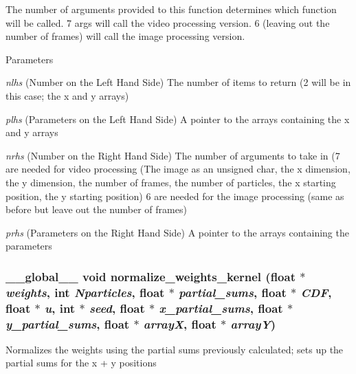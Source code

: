 The number of arguments provided to this function determines which function will be called. 7 args will call the video processing version. 6 (leaving out the number of frames) will call the image processing version. 
\begin{DoxyParams}{Parameters}
\item[{\em nlhs}](Number on the Left Hand Side) The number of items to return (2 will be in this case; the x and y arrays) \item[{\em plhs}](Parameters on the Left Hand Side) A pointer to the arrays containing the x and y arrays \item[{\em nrhs}](Number on the Right Hand Side) The number of arguments to take in (7 are needed for video processing (The image as an unsigned char, the x dimension, the y dimension, the number of frames, the number of particles, the x starting position, the y starting position) 6 are needed for the image processing (same as before but leave out the number of frames) \item[{\em prhs}](Parameters on the Right Hand Side) A pointer to the arrays containing the parameters \end{DoxyParams}
\hypertarget{ex__particle__CUDA__float_8cu_a94ffbf2cd3138980704183149ffba404}{
\subsubsection[{normalize\_\-weights\_\-kernel}]{\setlength{\rightskip}{0pt plus 5cm}\_\-\_\-global\_\-\_\- void normalize\_\-weights\_\-kernel (float $\ast$ {\em weights}, \/  int {\em Nparticles}, \/  float $\ast$ {\em partial\_\-sums}, \/  float $\ast$ {\em CDF}, \/  float $\ast$ {\em u}, \/  int $\ast$ {\em seed}, \/  float $\ast$ {\em x\_\-partial\_\-sums}, \/  float $\ast$ {\em y\_\-partial\_\-sums}, \/  float $\ast$ {\em arrayX}, \/  float $\ast$ {\em arrayY})}}
\label{ex__particle__CUDA__float_8cu_a94ffbf2cd3138980704183149ffba404}
Normalizes the weights using the partial sums previously calculated; sets up the partial sums for the x + y positions 
